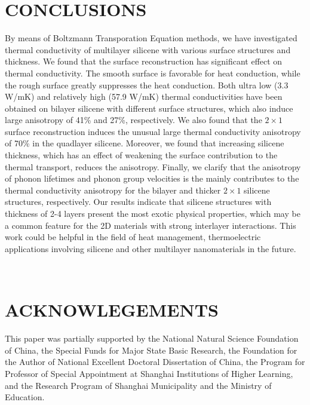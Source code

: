 \documentclass[aps,prb,twocolumn,showpacs,amsmath,amssymb]{revtex4-1}
\begin{document}
\section{CONCLUSIONS}
By means of Boltzmann Transporation Equation methods, we have investigated thermal conductivity of multilayer silicene with various surface structures and thickness.
We found that the surface reconstruction has significant effect on thermal conductivity.  The smooth surface is favorable for heat conduction, while the rough surface greatly suppresses the heat conduction. Both ultra low (3.3 W/mK) and relatively high (57.9 W/mK) thermal conductivities have been obtained on bilayer silicene with different surface structures, which also induce large anisotropy of 41\% and 27\%, respectively. We also found that the $2 \times 1$  surface reconstruction induces the unusual large thermal conductivity anisotropy of 70\%  in the quadlayer silicene.  Moreover, we found that increasing silicene thickness, which has an effect of weakening the surface contribution to the thermal transport,  reduces the anisotropy. Finally, we clarify that the anisotropy of phonon lifetimes and phonon group velocities is the mainly contributes to   the thermal conductivity anisotropy for the bilayer and thicker $2\times 1$ silicene structures, respectively. Our results indicate that silicene structures with thickness of 2-4 layers present the most  exotic physical  properties, which may be a common feature for the 2D materials with strong interlayer interactions.
This work could be helpful in the field of heat management, thermoelectric applications involving silicene and other multilayer nanomaterials in the future.

\quad \\
\section{ACKNOWLEGEMENTS}
This paper was partially supported by the National Natural Science Foundation of China, the Special Funds for Major State Basic Research, the Foundation for the Author of National Excellent Doctoral Dissertation of China, the Program for Professor of Special Appointment at Shanghai Institutions of Higher Learning, and the Research Program of Shanghai Municipality and the Ministry of Education.



\end{document}
